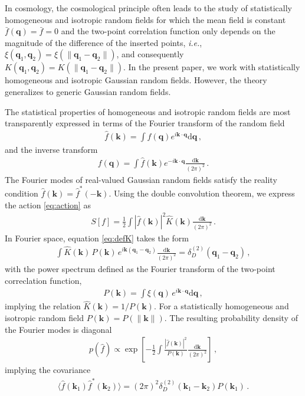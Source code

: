 \documentclass[a4paper, 11pt]{article}
\begin{document}
In cosmology, the cosmological principle often leads to the study of statistically homogeneous and isotropic random fields for which the mean field is constant $\bar{f}(\bm{q})=\bar{f}=0$ and the two-point correlation function only depends on the magnitude of the difference of the inserted points, \textit{i.e.}, $\xi(\bm{q}_1,\bm{q}_2)=\xi(\|\bm{q}_1-\bm{q}_2\|)$, and consequently $K(\bm{q}_1,\bm{q}_2)=K(\|\bm{q}_1-\bm{q}_2\|)$. In the present paper, we work with statistically homogeneous and isotropic Gaussian random fields. However, the theory generalizes to generic Gaussian random fields.

The statistical properties of homogeneous and isotropic random fields are most transparently expressed in terms of the Fourier transform of the random field
\begin{align}
\hat{f}(\bm{k}) = \int f(\bm{q})e^{i\bm{k}\cdot \bm{q}}\mathrm{d}\bm{q}\,,
\end{align}
and the inverse transform
\begin{align}
f(\bm{q}) = \int \hat{f}(\bm{k})e^{-i \bm{k} \cdot \bm{q}}\frac{\mathrm{d}\bm{k}}{(2\pi)^2}\,.
\end{align}
The Fourier modes of real-valued Gaussian random fields satisfy the reality condition $\hat{f}(\bm{k}) = \hat{f}^*(-\bm{k})$. Using the double convolution theorem, we express the action \eqref{eq:action} as
\begin{align}
S[f] = \frac{1}{2} \int |\hat{f}(\bm{k})|^2 \hat{K}(\bm{k}) \frac{\mathrm{d}\bm{k}}{(2\pi)^2}\,.
\end{align}
In Fourier space, equation \eqref{eq:defK} takes the form
\begin{align}
\int \hat{K}(\bm{k})\, P(\bm{k})\, e^{i\bm{k}(\bm{q}_1-\bm{q}_2)} \frac{\mathrm{d}\bm{k}}{(2\pi)^2} = \delta_D^{(2)}(\bm{q}_1 - \bm{q}_2)\,,
\end{align}
with the power spectrum defined as the Fourier transform of the two-point correclation function,
\begin{align}
P(\bm{k}) = \int \xi(\bm{q}) \, e^{i\bm{k}\cdot \bm{q}}\mathrm{d}\bm{q}\,,
\end{align}
implying the relation $\hat{K}(\bm{k}) = 1/P(\bm{k})$. For a statistically homogeneous and isotropic random field $P(\bm{k})=P(\|\bm{k}\|)$. The resulting probability density of the Fourier modes is diagonal
\begin{align}
p(\hat{f}) \propto \exp\left[ -\frac{1}{2} \int \frac{|\hat{f}(\bm{k})|^2}{P(\bm{k})} \frac{\mathrm{d}\bm{k}}{(2\pi)^2}\right]\,,
\end{align}
implying the covariance
\begin{align}
\langle \hat{f}(\bm{k}_1)\hat{f}^*(\bm{k}_2) \rangle = (2\pi)^2 \delta_D^{(2)}(\bm{k}_1-\bm{k}_2) P(\bm{k}_1)\,.
\end{align}
\end{document}
